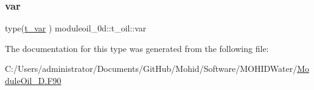\subsubsection{\texorpdfstring{var}{var}}
{\footnotesize\ttfamily type(\mbox{\hyperlink{structmoduleoil__0d_1_1t__var}{t\+\_\+var}} ) moduleoil\+\_\+0d\+::t\+\_\+oil\+::var\hspace{0.3cm}{\ttfamily [private]}}



The documentation for this type was generated from the following file\+:\begin{DoxyCompactItemize}
\item 
C\+:/\+Users/administrator/\+Documents/\+Git\+Hub/\+Mohid/\+Software/\+M\+O\+H\+I\+D\+Water/\mbox{\hyperlink{_module_oil__0_d_8_f90}{Module\+Oil\+\_\+D.\+F90}}\end{DoxyCompactItemize}
